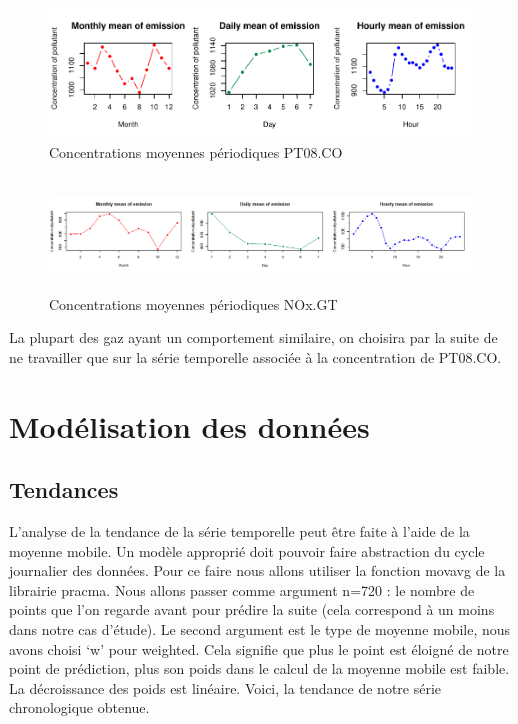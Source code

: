 \documentclass[
]{article}
\begin{document}
\begin{figure}

{\centering \includegraphics{STA202_report_files/figure-latex/PT08.CO-1} 

}

\caption{\label{fig:PT08.CO} Concentrations moyennes périodiques PT08.CO}\label{fig:PT08.CO}
\end{figure}

\begin{figure}
  \centering
  \includegraphics[height=3cm]{Nox}
  \caption{Concentrations moyennes périodiques NOx.GT}
\end{figure}

La plupart des gaz ayant un comportement similaire, on choisira par la
suite de ne travailler que sur la série temporelle associée à la
concentration de PT08.CO.

\hypertarget{moduxe9lisation-des-donnuxe9es}{%
\section{Modélisation des
données}\label{moduxe9lisation-des-donnuxe9es}}

\hypertarget{tendances}{%
\subsection{Tendances}\label{tendances}}

L'analyse de la tendance de la série temporelle peut être faite à l'aide
de la moyenne mobile. Un modèle approprié doit pouvoir faire abstraction
du cycle journalier des données. Pour ce faire nous allons utiliser la
fonction movavg de la librairie pracma. Nous allons passer comme
argument n=720 : le nombre de points que l'on regarde avant pour prédire
la suite (cela correspond à un moins dans notre cas d'étude). Le second
argument est le type de moyenne mobile, nous avons choisi `w' pour
weighted. Cela signifie que plus le point est éloigné de notre point de
prédiction, plus son poids dans le calcul de la moyenne mobile est
faible. La décroissance des poids est linéaire. Voici, la tendance de
notre série chronologique obtenue.
\end{document}
